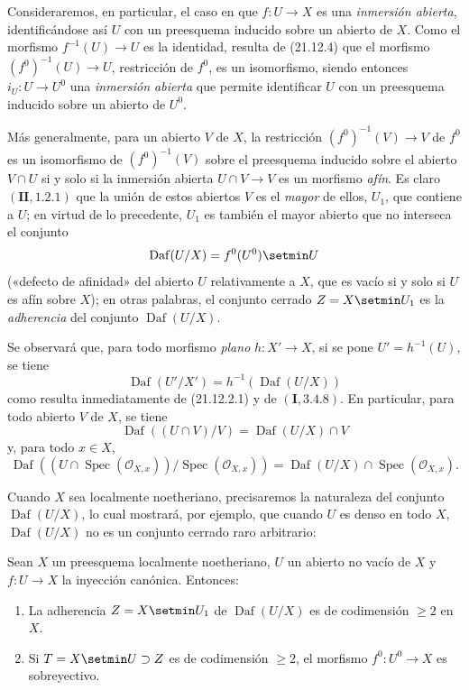 \begin{env}[21.12.5]
\label{IV.21.12.5}
Consideraremos, en particular, el caso en que $f:U\to X$ es una \emph{inmersión
abierta}, identificándose así $U$ con un preesquema inducido sobre un abierto de $X$.
Como el
morfismo $f^{-1}(U)\to U$ es la identidad, resulta de (21.12.4) que el morfismo
$(f^0)^{-1}(U)\to U$, restricción de $f^0$, es un isomorfismo, siendo entonces
$i_U:U\to U^0$ una \emph{inmersión abierta} que permite identificar $U$ con un
preesquema inducido sobre un abierto de $U^0$.

Más generalmente, para un abierto $V$ de $X$, la restricción $(f^0)^{-1}(V)\to V$ de
$f^0$ es un isomorfismo de $(f^0)^{-1}(V)$ sobre el preesquema inducido sobre el abierto
$V\cap U$ si y solo si la inmersión abierta $U\cap V\to V$ es un morfismo
\emph{afín}. Es claro $(\mathbf{II}, 1.2.1)$
que la unión de estos abiertos $V$ es el \emph{mayor} de ellos, $U_1$, que
contiene a $U$; en virtud de lo precedente, $U_1$ es también el mayor abierto que no
interseca el conjunto
\[
  \operatorname{Daf}(U/X)=f^0(U^0)\setmin U
\]
(«defecto de afinidad» del abierto $U$ relativamente a $X$, que es vacío si y solo
si $U$ es afín sobre $X$); en otras palabras, el conjunto cerrado $Z=X\setmin U_1$ es la
\emph{adherencia} del conjunto $\operatorname{Daf}(U/X)$.

Se observará que, para todo morfismo \emph{plano} $h:X'\to X$, si se pone
$U'=h^{-1}(U)$, se tiene
\[
\label{IV.21.12.5.1}
  \operatorname{Daf}(U'/X')=h^{-1}(\operatorname{Daf}(U/X))
  \tag{21.12.5.1}
\]
como resulta inmediatamente de (21.12.2.1) y de $(\mathbf I, 3.4.8)$. En particular,
para todo abierto $V$ de $X$, se tiene
\[
\label{IV.21.12.5.2}
  \operatorname{Daf}((U\cap V)/V)=\operatorname{Daf}(U/X)\cap V
  \tag{21.12.5.2}
\]
y, para todo $x\in X$,
\[
\label{IV.21.12.5.3}
  \operatorname{Daf}((U\cap\operatorname{Spec}(\mathcal O_{X,x}))
  /\operatorname{Spec}(\mathcal O_{X,x}))
  =\operatorname{Daf}(U/X)\cap\operatorname{Spec}(\mathcal O_{X,x}).
  \tag{21.12.5.3}
\]
\end{env}

Cuando $X$ sea localmente noetheriano, precisaremos la naturaleza del conjunto
$\operatorname{Daf}(U/X)$, lo cual mostrará, por ejemplo, que cuando $U$ es denso en
todo $X$, $\operatorname{Daf}(U/X)$ no es un conjunto cerrado raro
arbitrario:

\begin{theorem}[21.12.6]
\label{IV.21.12.6}
Sean $X$ un preesquema localmente noetheriano, $U$ un abierto no vacío de $X$ y
$f:U\to X$ la inyección canónica. Entonces:
\begin{enumerate}[label=\textup{(\roman*)}]
  \item La adherencia $Z=X\setmin U_1$ de $\operatorname{Daf}(U/X)$ es de codimensión
  $\geq2$ en $X$.
  \item Si $T=X\setmin U\supset Z$ es de codimensión $\geq2$, el morfismo
  $f^0:U^0\to X$ es sobreyectivo.
\end{enumerate}
\end{theorem}

